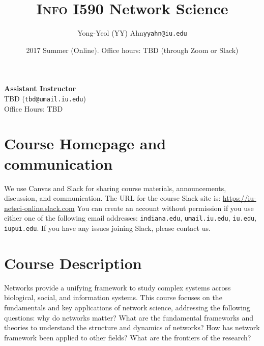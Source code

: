 \documentclass[11pt,article,oneside]{memoir}
\makeatletter
\def\myauthor{Author}
\def\mytitle{Title}
\def\myemail{yyahn@iu.edu}
\def\myauthor{Yong-Yeol (YY) Ahn}
\def\mytitle{{\normalsize \textsc{Info} I590 \newline} \HUGE Network Science}
\makeatother
\begin{document}

\def\ind{\hangindent=1 true cm\hangafter=1 \noindent}
\def\labelitemi{$\cdot$}


\title{\LARGE \mytitle}     
\author{\Large\myauthor \newline \footnotesize\texttt{\noindent\myemail}}
\date{2017 Summer (Online). %
\newline Office hours: TBD (through Zoom or Slack)}

\maketitle

\vspace{-20pt}
{\bfseries Assistant Instructor} \\ TBD (\texttt{tbd@umail.iu.edu}) \\ Office Hours: TBD

\section{Course Homepage and communication}

We use Canvas and Slack for sharing course materials, announcements,
discussion, and communication. The URL for the course Slack site is:
\url{https://iu-netsci-online.slack.com} You can create an account without
permission if you use either one of the following email addresses:
\texttt{indiana.edu}, \texttt{umail.iu.edu}, \texttt{iu.edu},
\texttt{iupui.edu}. If you have any issues joining Slack, please contact us. 


\section{Course Description}

Networks provide a unifying framework to study complex systems across
biological, social, and information systems. This course focuses on the
fundamentals and key applications of network science, addressing the following
questions: why do networks matter? What are the fundamental frameworks and
theories to understand the structure and dynamics of networks?  How has network
framework been applied to other fields? What are the frontiers of the research?
\end{document}

